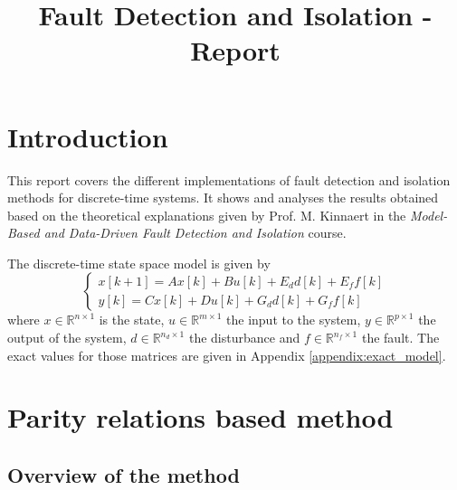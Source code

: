 \documentclass[conference]{IEEEtran}
\begin{document}
\title{Fault Detection and Isolation - Report}

\author{}

\maketitle

\section{Introduction}

This report covers the different implementations of fault detection and isolation methods for discrete-time systems. It shows and analyses the results obtained based on the theoretical explanations given by Prof. M. Kinnaert in the \textit{Model-Based and Data-Driven Fault Detection and Isolation} course.

The discrete-time state space model is given by
\begin{equation}
    \begin{cases}
        x[k+1] = A x[k] + B u[k] + E_d d[k] + E_f f[k] \\
        y[k] = C x[k] + D u[k] + G_d d[k] + G_f f[k]
    \end{cases}
    \label{eq:ss_model}
\end{equation}
where $x \in \mathbb{R}^{n \times 1}$ is the state, $u \in \mathbb{R}^{m \times 1}$ the input to the system, $y \in \mathbb{R}^{p \times 1}$ the output of the system, $d \in \mathbb{R}^{n_d \times 1}$ the disturbance and $f \in \mathbb{R}^{n_f \times 1}$ the fault. The exact values for those matrices are given in Appendix \ref{appendix:exact_model}.

\section{Parity relations based method}

\subsection{Overview of the method}
\end{document}
